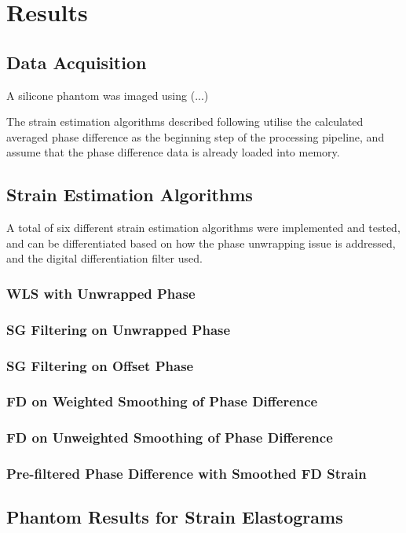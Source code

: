 \chapter{Results}


\section{Data Acquisition}
A silicone phantom was imaged using (...)

The strain estimation algorithms described following utilise the calculated averaged phase difference as the beginning step of the processing pipeline, and assume that the phase difference data is already loaded into memory.

\section{Strain Estimation Algorithms}
A total of six different strain estimation algorithms were implemented and tested, and can be differentiated based on how the phase unwrapping issue is addressed, and the digital differentiation filter used. 
\subsection{WLS with Unwrapped Phase}
\subsection{SG Filtering on Unwrapped Phase}
\subsection{SG Filtering on Offset Phase}
\subsection{FD on Weighted Smoothing of Phase Difference}
\subsection{FD on Unweighted Smoothing of Phase Difference}
\subsection{Pre-filtered Phase Difference with Smoothed FD Strain}

\section{Phantom Results for Strain Elastograms}

